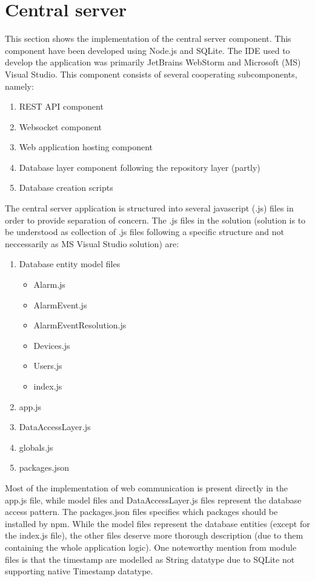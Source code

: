 \section {Central server}
\label {sec:implserver}

This section shows the implementation of the central server component. This component have been developed using Node.js and SQLite. The IDE used to develop the application was primarily JetBrains WebStorm and Microsoft (MS) Visual Studio. This component consists of several cooperating subcomponents, namely:
\begin{enumerate}
	\item REST API component
	\item Websocket component
	\item Web application hosting component
	\item Database layer component following the repository layer (partly)
	\item Database creation scripts
\end{enumerate}

\smallskip
The central server application is structured into several javascript (.js) files in order to provide separation of concern. The .js files in the solution (solution is to be understood as collection of .js files following a specific structure and not neccessarily as MS Visual Studio solution) are: \newline
\begin{enumerate}
	\item Database entity model files
\begin{itemize}
	\item Alarm.js
	\item AlarmEvent.js
	\item AlarmEventResolution.js
	\item Devices.js
	\item Users.js
	\item index.js
\end{itemize}
\item app.js
\item DataAccessLayer.js
\item globals.js
\item packages.json
\end{enumerate}

\smallskip
Most of the implementation of web communication is present directly in the app.js file, while model files and DataAccessLayer.js files represent the database access pattern. The packages.json files specifies which packages should be installed by npm. While the model files represent the database entities (except for the index.js file), the other files deserve more thorough description (due to them containing the whole application logic). One noteworthy mention from module files is that the timestamp are modelled as String datatype due to SQLite not supporting native Timestamp datatype.
\smallskip

